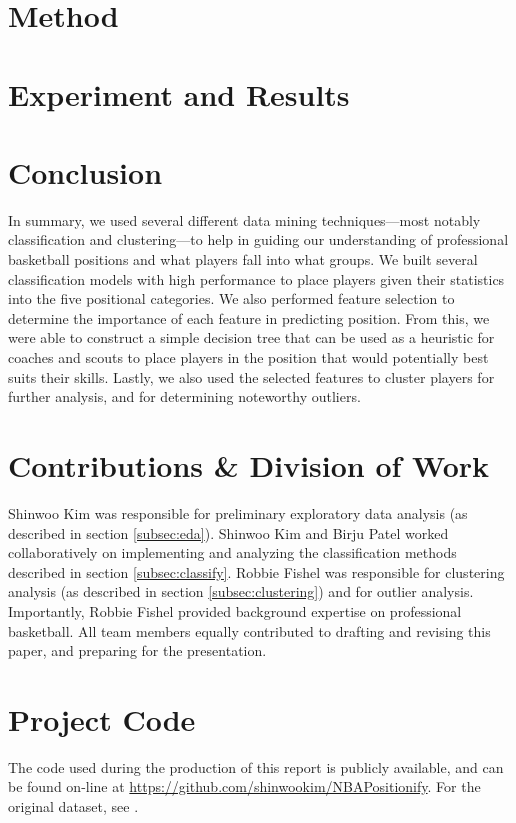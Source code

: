 \documentclass[nonacm]{acmart}
\begin{document}
\section{Method}



\section{Experiment and Results}




\section{Conclusion}
In summary, we used several different data mining techniques—most notably classification and clustering—to help in guiding our understanding of professional basketball positions and what players fall into what groups. We built several classification models with high performance to place players given their statistics into the five positional categories. We also performed feature selection to determine the importance of each feature in predicting position. From this, we were able to construct a simple decision tree that can be used as a heuristic for coaches and scouts to place players in the position that would potentially best suits their skills. Lastly, we also used the selected features to cluster players for further analysis, and for determining noteworthy outliers.

\appendix
\section{Contributions \& Division of Work}
Shinwoo Kim was responsible for preliminary exploratory data analysis (as described in section \ref{subsec:eda}). Shinwoo Kim and Birju Patel worked collaboratively on implementing and analyzing the classification methods described in section \ref{subsec:classify}. Robbie Fishel was responsible for clustering analysis (as described in section \ref{subsec:clustering}) and for outlier analysis. Importantly, Robbie Fishel provided background expertise on professional basketball. All team members equally contributed to drafting and revising this paper, and preparing for the presentation.

\section{Project Code}
The code used during the production of this report is publicly available, and can be found on-line at \url{https://github.com/shinwookim/NBAPositionify}. For the original dataset, see \cite{basketball_reference_2000}.



\end{document}
